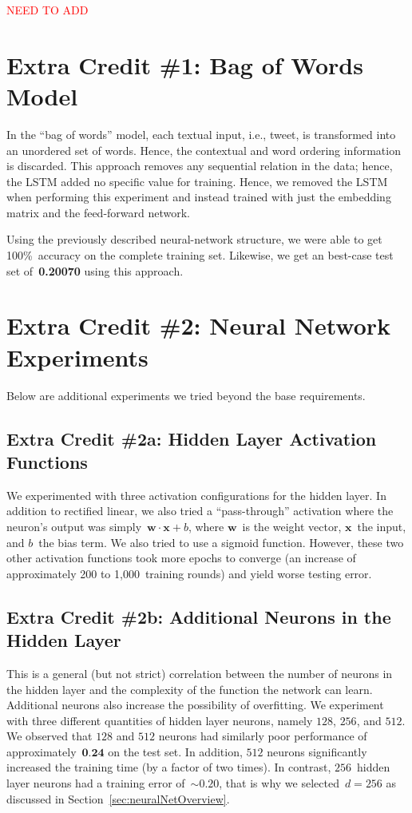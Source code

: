 \documentclass{report}
\begin{document}
  {\textcolor{red}{\Large NEED TO ADD}}
  
  \section{Extra Credit \#1: Bag of Words Model}
  
  In the ``bag of words'' model, each textual input, i.e., tweet, is transformed into an unordered set of words.  Hence, the contextual and word ordering information is discarded.  This approach removes any sequential relation in the data; hence, the LSTM added no specific value for training.  Hence, we removed the LSTM when performing this experiment and instead trained with just the embedding matrix and the feed-forward network. 
  
  Using the previously described neural-network structure, we were able to get 100\%~accuracy on the complete training set.  Likewise, we get an best-case test set of~\textbf{0.20070} using this approach.
  
  \section{Extra Credit \#2: Neural Network Experiments}
  
  Below are additional experiments we tried beyond the base requirements.  
  
  \subsection{Extra Credit \#2a: Hidden Layer Activation Functions}
  
  We experimented with three activation configurations for the hidden layer.  In addition to rectified linear, we also tried a ``pass-through'' activation where the neuron's output was simply~$\textbf{w}\cdot\textbf{x} + b$, where $\textbf{w}$~is the weight vector, $\textbf{x}$~the input, and $b$~the bias term.  We also tried to use a sigmoid function.  However, these two other activation functions took more epochs to converge (an increase of approximately 200 to 1,000~training rounds) and yield worse testing error.
  
  \subsection{Extra Credit \#2b: Additional Neurons in the Hidden Layer}\label{sec:ecMoreHiddenLayerNeurons}
  
  This is a general (but not strict) correlation between the number of neurons in the hidden layer and the complexity of the function the network can learn.  Additional neurons also increase the possibility of overfitting.  We experiment with three different quantities of hidden layer neurons, namely $128$, $256$, and $512$.  We observed that $128$ and $512$ neurons had similarly poor performance of approximately~$\textbf{0.24}$ on the test set.  In addition, $512$ neurons significantly increased the training time (by a factor of two times).  In contrast, $256$~hidden layer neurons had a training error of~$\sim0.20$, that is why we selected~$d=256$ as discussed in Section~\ref{sec:neuralNetOverview}.
     
\end{document}
